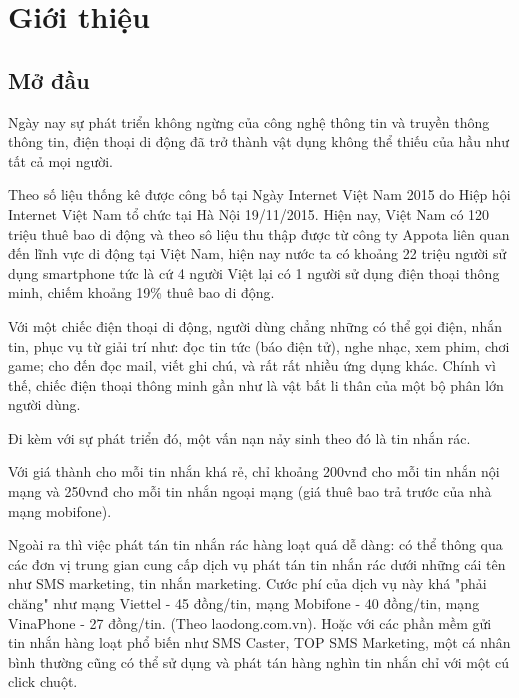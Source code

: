\chapter{Giới thiệu}
\section{Mở đầu}\label{ch:introduction}

Ngày nay sự phát triển không ngừng của công nghệ thông tin và truyền thông thông tin, điện thoại di động đã trở thành vật dụng không thể thiếu của hầu như tất cả mọi người.

Theo số liệu thống kê được công bố tại Ngày Internet Việt Nam 2015 do Hiệp hội Internet Việt Nam tổ chức tại Hà Nội 19/11/2015. Hiện nay, Việt Nam có 120 triệu thuê bao di động và theo sô liệu thu thập được từ công ty Appota liên quan đến lĩnh vực di động tại Việt Nam, hiện nay nước ta có khoảng 22 triệu người sử dụng smartphone tức là cứ 4 người Việt lại có 1 người sử dụng điện thoại thông minh, chiếm khoảng 19\% thuê bao di động.

Với một chiếc điện thoại di động, người dùng chẳng những có thể gọi điện, nhắn tin, phục vụ từ giải trí như: đọc tin tức (báo điện tử), nghe nhạc, xem phim, chơi game; cho đến đọc mail, viết ghi chú, và rất rất nhiều ứng dụng khác. Chính vì thế, chiếc điện thoại thông minh gần như là vật bất li thân của một bộ phân lớn người dùng.
 
Đi kèm với sự phát triển đó, một vấn nạn nảy sinh theo đó là tin nhắn rác.


Với giá thành cho mỗi tin nhắn khá rẻ, chỉ khoảng 200vnđ cho mỗi tin nhắn nội mạng và 250vnđ cho mỗi tin nhắn ngoại mạng (giá thuê bao trả trước của nhà mạng mobifone).

Ngoài ra thì việc phát tán tin nhắn rác hàng loạt quá dễ dàng: có thể thông qua các đơn vị trung gian cung cấp dịch vụ phát tán tin nhắn rác dưới những cái tên như SMS marketing, tin nhắn marketing. Cước phí của dịch vụ này khá "phải chăng" như mạng Viettel - 45 đồng/tin, mạng Mobifone  - 40 đồng/tin, mạng VinaPhone - 27 đồng/tin. (Theo laodong.com.vn). Hoặc với các phần mềm gửi tin nhắn hàng loạt phổ biến như SMS Caster, TOP SMS Marketing, một cá nhân bình thường cũng có thể sử dụng và phát tán hàng nghìn tin nhắn chỉ với một cú click chuột.

